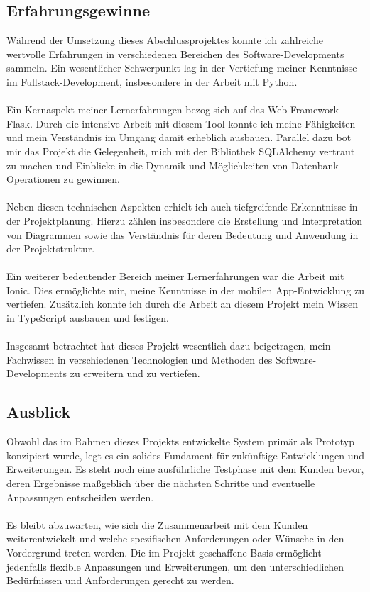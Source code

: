 \documentclass[a4paper,12pt]{article}
\begin{document}
\subsection{Erfahrungsgewinne}
Während der Umsetzung dieses Abschlussprojektes konnte ich zahlreiche wertvolle Erfahrungen in verschiedenen Bereichen des Software-Developments sammeln. Ein wesentlicher Schwerpunkt lag in der Vertiefung meiner Kenntnisse im Fullstack-Development, insbesondere in der Arbeit mit Python.\\
\\
Ein Kernaspekt meiner Lernerfahrungen bezog sich auf das Web-Framework Flask. Durch die intensive Arbeit mit diesem Tool konnte ich meine Fähigkeiten und mein Verständnis im Umgang damit erheblich ausbauen. Parallel dazu bot mir das Projekt die Gelegenheit, mich mit der Bibliothek SQLAlchemy vertraut zu machen und Einblicke in die Dynamik und Möglichkeiten von Datenbank-Operationen zu gewinnen.\\
\\
Neben diesen technischen Aspekten erhielt ich auch tiefgreifende Erkenntnisse in der Projektplanung. Hierzu zählen insbesondere die Erstellung und Interpretation von Diagrammen sowie das Verständnis für deren Bedeutung und Anwendung in der Projektstruktur.\\
\\
Ein weiterer bedeutender Bereich meiner Lernerfahrungen war die Arbeit mit Ionic. Dies ermöglichte mir, meine Kenntnisse in der mobilen App-Entwicklung zu vertiefen. Zusätzlich konnte ich durch die Arbeit an diesem Projekt mein Wissen in TypeScript ausbauen und festigen.\\
\\
Insgesamt betrachtet hat dieses Projekt wesentlich dazu beigetragen, mein Fachwissen in verschiedenen Technologien und Methoden des Software-Developments zu erweitern und zu vertiefen.

\subsection{Ausblick}
Obwohl das im Rahmen dieses Projekts entwickelte System primär als Prototyp konzipiert wurde, legt es ein solides Fundament für zukünftige Entwicklungen und Erweiterungen. Es steht noch eine ausführliche Testphase mit dem Kunden bevor, deren Ergebnisse maßgeblich über die nächsten Schritte und eventuelle Anpassungen entscheiden werden.\\
\\
Es bleibt abzuwarten, wie sich die Zusammenarbeit mit dem Kunden weiterentwickelt und welche spezifischen Anforderungen oder Wünsche in den Vordergrund treten werden. Die im Projekt geschaffene Basis ermöglicht jedenfalls flexible Anpassungen und Erweiterungen, um den unterschiedlichen Bedürfnissen und Anforderungen gerecht zu werden.
\end{document}
